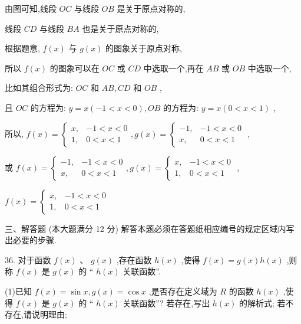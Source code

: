 \documentclass[10pt]{article}
\begin{document}
由图可知,线段 \({OC}\) 与线段 \({OB}\) 是关于原点对称的,

线段 \({CD}\) 与线段 \({BA}\) 也是关于原点对称的,

根据题意, \(f\left( x\right)\) 与 \(g\left( x\right)\) 的图象关于原点对称,

所以 \(f\left( x\right)\) 的图象可以在 \({OC}\) 或 \({CD}\) 中选取一个,再在 \({AB}\) 或 \({OB}\) 中选取一个,

比如其组合形式为: \({OC}\) 和 \({AB},{CD}\) 和 \({OB}\) ,

且 \({OC}\) 的方程为: \(y = x\left( {-1 < x < 0}\right) ,{OB}\) 的方程为: \(y = x\left( {0 < x < 1}\right)\) ,

所以, \(f\left( x\right)  = \left\{  {\begin{array}{ll} x, &  - 1 < x < 0 \\  1, & 0 < x < 1 \end{array},g\left( x\right)  = \left\{  \begin{array}{ll}  - 1, &  - 1 < x < 0 \\  x, & 0 < x < 1 \end{array}\right. }\right.\) ,

或 \(f\left( x\right)  = \left\{  {\begin{array}{ll}  - 1, &  - 1 < x < 0 \\  x, & 0 < x < 1 \end{array},g\left( x\right)  = \left\{  \begin{array}{ll} x, &  - 1 < x < 0 \\  1, & 0 < x < 1 \end{array}\right. }\right.\) ,

\(f\left( x\right)  = \left\{  \begin{array}{ll} x, &  - 1 < x < 0 \\  1, & 0 < x < 1 \end{array}\right.\)

三、解答题 (本大题满分 12 分) 解答本题必须在答题纸相应编号的规定区域内写出必要的步骤.

36. 对于函数 \(f\left( x\right) \text{ 、 }g\left( x\right)\) ,存在函数 \(h\left( x\right)\) ,使得 \(f\left( x\right)  = g\left( x\right) h\left( x\right)\) ,则称 \(f\left( x\right)\) 是 \(g\left( x\right)\) 的 “ \(h\left( x\right)\) 关联函数”.

(1)已知 \(f\left( x\right)  = \sin x,g\left( x\right)  = \cos x\) ,是否存在定义域为 \(R\) 的函数 \(h\left( x\right)\) ,使得 \(f\left( x\right)\) 是 \(g\left( x\right)\) 的 “ \(h\left( x\right)\) 关联函数”? 若存在,写出 \(h\left( x\right)\) 的解析式; 若不存在,请说明理由;
\end{document}
